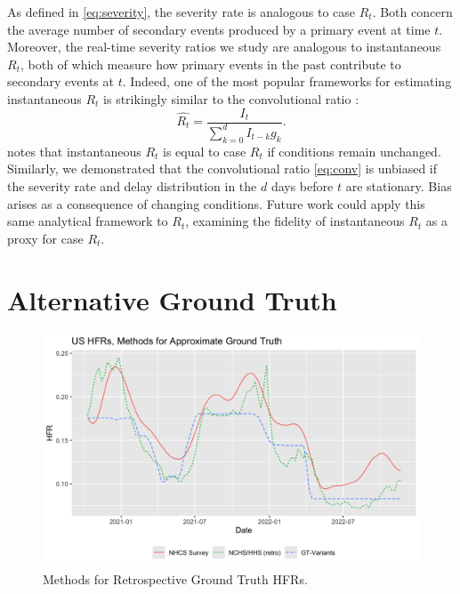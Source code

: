 \documentclass{article}
\begin{document}
As defined in \ref{eq:severity}, the severity rate is analogous to case $R_t$. Both concern the average number of secondary events produced by a primary event at time $t$. Moreover, the real-time severity ratios we study are analogous to instantaneous $R_t$, both of which measure how primary events in the past contribute to secondary events at $t$. Indeed, one of the most popular frameworks for estimating instantaneous $R_t$ is strikingly similar to the convolutional ratio \cite{fraser2007,wallinga2007how,cori2013new}:
\begin{equation}\label{eq:instRt}
    \hat{R_t} = \frac{I_t}{\sum_{k=0}^d I_{t-k}g_k}.
\end{equation}
\citeauthor{fraser2007} notes that instantaneous $R_t$ is equal to case $R_t$ if conditions remain unchanged. Similarly, we demonstrated that the convolutional ratio \ref{eq:conv} is unbiased if the severity rate and delay distribution in the $d$ days before $t$ are stationary. Bias arises as a consequence of changing conditions. Future work could apply this same analytical framework to $R_t$, examining the fidelity of instantaneous $R_t$ as a proxy for case $R_t$. 





\pagebreak
\appendix
\section{Alternative Ground Truth}\label{apx:alt_gt}

\begin{figure}
    \centering
    \includegraphics[width=0.8\linewidth]{Figs/ApproxGT.png}
    \caption{Methods for Retrospective Ground Truth HFRs.}
    \label{fig:approxGT}
\end{figure}
\end{document}
